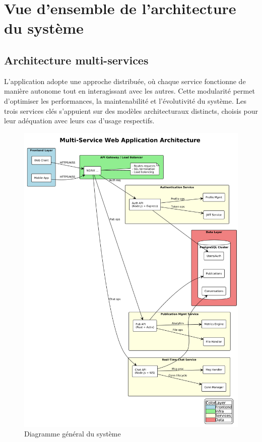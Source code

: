\documentclass{rapportPfe}
\begin{document}
\section{Vue d’ensemble de l’architecture du système}

\subsection{Architecture multi-services}

L’application adopte une approche distribuée, où chaque service fonctionne de manière autonome tout en interagissant avec les autres. Cette modularité permet d’optimiser les performances, la maintenabilité et l’évolutivité du système. Les trois services clés s’appuient sur des modèles architecturaux distincts, choisis pour leur adéquation avec leurs cas d’usage respectifs.


\begin{figure}[htbp]
    \centering
    \includegraphics[width=1.0\textwidth]{diagrams/diagram.png}
    \caption{Diagramme général du système}
    \label{fig:diagram-general}
\end{figure}
\end{document}
